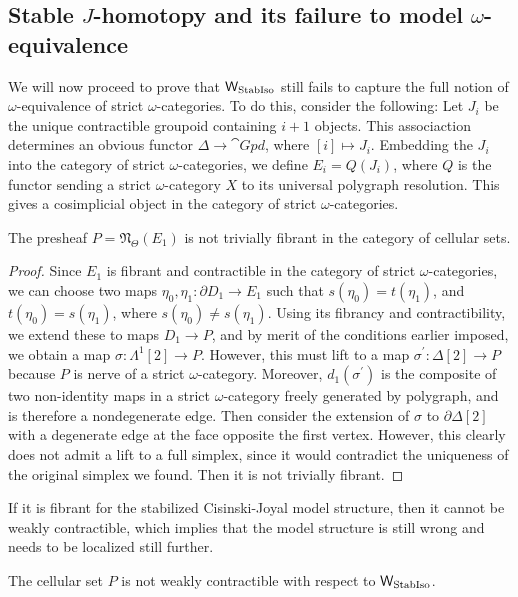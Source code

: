\subsection{Stable $J$-homotopy and its failure to model $\omega$-equivalence}\label{stablefailure}
We will now proceed to prove that \(\mathsf{W}_{\operatorname{StabIso}}\) still fails to capture the full notion of \(\omega\)-equivalence of strict \(\omega\)-categories. To do this, consider the following: Let \(J_i\) be the unique contractible groupoid containing \(i+1\) objects. This associaction determines an obvious functor \(\Delta\to \cat{Gpd}\), where  \([i]\mapsto J_i\).  Embedding the \(J_i\) into the category of strict \(\omega\)-categories, we define \(E_i=Q(J_i)\), where \(Q\) is the functor sending a strict \(\omega\)-category \(X\) to its universal polygraph resolution.  This gives a cosimplicial object in the category of strict \(\omega\)-categories.
\begin{lemma} The presheaf \(P=\mathfrak{N}_\Theta(E_1)\) is not trivially fibrant in the category of cellular sets. 
\end{lemma}
\begin{proof} Since \(E_1\) is fibrant and contractible in the category of strict \(\omega\)-categories, we can choose two maps \(\eta_0, \eta_1: \partial D_1 \to E_1\) such that \(s(\eta_0) = t(\eta_1)\), and \(t(\eta_0) = s(\eta_1)\), where \(s(\eta_0)\neq s(\eta_1)\).  Using its fibrancy and contractibility, we extend these to maps \(D_1 \to P\), and by merit of the conditions earlier imposed, we obtain a map \(\sigma:\Lambda^1[2]\to P\).  However, this must lift to a map \(\sigma^\prime:\Delta[2] \to P\) because \(P\) is nerve of a strict \(\omega\)-category. Moreover, \(d_1(\sigma^\prime)\) is the composite of two non-identity maps in a strict \(\omega\)-category freely generated by polygraph, and is therefore a nondegenerate edge.  Then consider the extension of \(\sigma\) to \(\partial\Delta[2]\) with a degenerate edge at the face opposite the first vertex.  However, this clearly does not admit a lift to a full simplex, since it would contradict the uniqueness of the original simplex we found.  Then it is not trivially fibrant.  
\end{proof}
If it is fibrant for the stabilized Cisinski-Joyal model structure, then it cannot be weakly contractible, which implies that the model structure is still wrong and needs to be localized still further.
\begin{thm} The cellular set \(P\) is not weakly contractible with respect to \(\mathsf{W}_{\operatorname{StabIso}}\).
\end{thm}

